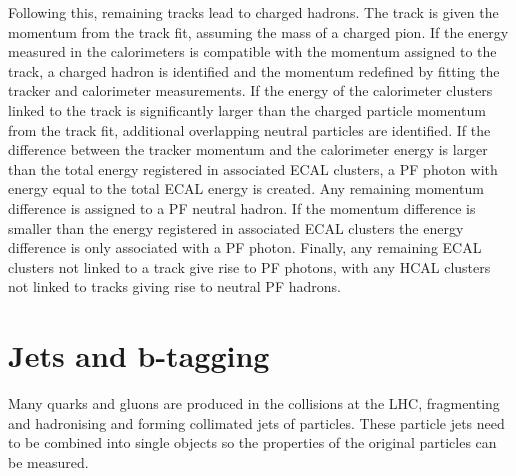 Following this, remaining tracks lead to charged hadrons. The track is
given the momentum from the track fit, assuming the mass of a charged pion. If
the energy measured in the calorimeters is compatible with the momentum assigned
to the track, a charged hadron is identified and the
momentum redefined by fitting the tracker and calorimeter measurements. If
the energy of the calorimeter clusters linked to the track is significantly larger than the
charged particle momentum from the track fit, additional overlapping neutral particles
are identified. If the difference between the tracker momentum and the calorimeter
energy is larger than the total energy registered in associated \ac{ECAL} clusters,
a \ac{PF} photon with energy equal to the total \ac{ECAL} energy is created.
Any remaining momentum difference is assigned to a \ac{PF} neutral hadron. If the momentum
difference is smaller than the energy registered in associated \ac{ECAL} clusters 
the energy difference is only associated with a \ac{PF} photon. %
Finally, any remaining \ac{ECAL} clusters not linked to a track give
rise to \ac{PF} photons, with any \ac{HCAL} clusters
not linked to tracks giving rise to neutral \ac{PF} hadrons.

\section{Jets and b-tagging}
\label{sec:objects_jets}
Many quarks and gluons are produced in the collisions at the \ac{LHC},
fragmenting and hadronising and forming collimated
jets of particles. These particle jets need to be combined
into single objects so the properties of the original particles can
be measured.

